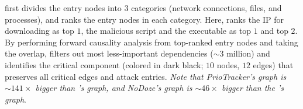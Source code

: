 \tool first divides the entry nodes into $3$ categories (\ie network connections, files, and processes), and ranks the entry nodes in each category.
Here, \tool ranks the IP  for  downloading as top $1$, the malicious script  and the executable 
as top $1$ and top $2$.
By performing forward causality analysis from top-ranked entry nodes and taking the overlap, \tool filters out most less-important dependencies ($\sim 3$ million) and identifies the critical component (colored in dark black; $10$ nodes, $12$ edges) that preserves all critical edges and attack entries.
\textit{Note that PrioTracker's graph is $\sim141\times$ bigger than \tool's graph, and NoDoze's graph is $\sim46\times$ bigger than the \tool's graph}.


